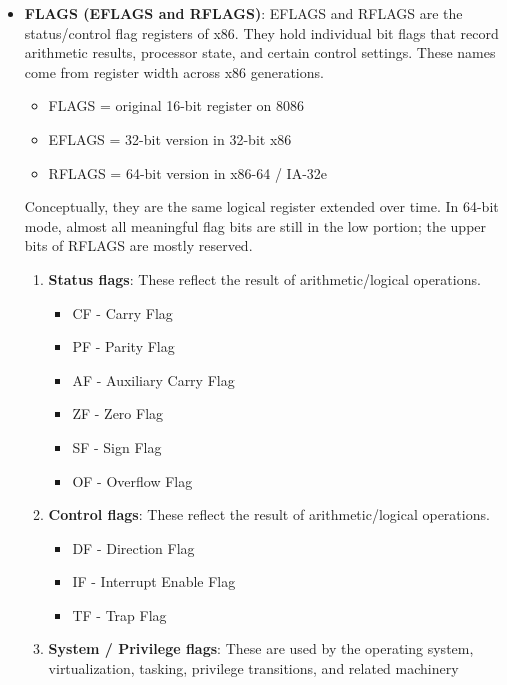 \documentclass{report}
\begin{document}
\begin{itemize}
        \item \textbf{FLAGS (EFLAGS and RFLAGS)}: EFLAGS and RFLAGS are the status/control flag registers of x86.
            \bigbreak \noindent 
            They hold individual bit flags that record arithmetic results, processor state, and certain control settings. 
            \bigbreak \noindent 
            These names come from register width across x86 generations.
            \begin{itemize}
                \item FLAGS = original 16-bit register on 8086
                \item EFLAGS = 32-bit version in 32-bit x86
                \item RFLAGS = 64-bit version in x86-64 / IA-32e
            \end{itemize}
            Conceptually, they are the same logical register extended over time. In 64-bit mode, almost all meaningful flag bits are still in the low portion; the upper bits of RFLAGS are mostly reserved.
            \begin{enumerate}
                \item \textbf{Status flags}: These reflect the result of arithmetic/logical operations.
                    \begin{itemize}
                        \item CF - Carry Flag
                        \item PF - Parity Flag
                        \item AF - Auxiliary Carry Flag
                        \item ZF - Zero Flag
                        \item SF - Sign Flag
                        \item OF - Overflow Flag
                    \end{itemize}
                \item \textbf{Control flags}: These reflect the result of arithmetic/logical operations.
                    \begin{itemize}
                        \item DF - Direction Flag
                        \item IF - Interrupt Enable Flag
                        \item TF - Trap Flag
                    \end{itemize}
                \item \textbf{System / Privilege flags}: These are used by the operating system, virtualization, tasking, privilege transitions, and related machinery

\end{enumerate}
\end{itemize}
\end{document}
